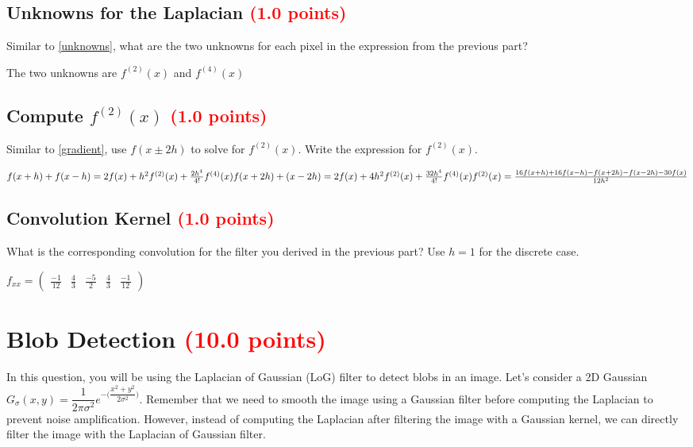 \documentclass[answers]{exam}
\newcommand{\mypoints}[1]{\textcolor{red}{(#1 points)}}
\begin{document}
\subsection{Unknowns for the Laplacian \mypoints{1.0}}
Similar to \ref{unknowns}, what are the two unknowns for each pixel in the expression from the previous part?
\begin{solution}
The two unknowns are $f^{(2)}(x)$ and $f^{(4)}(x)$
\end{solution}

\subsection{Compute $f^{(2)}(x)$ \mypoints{1.0}}
Similar  to \ref{gradient}, use $f(x \pm 2h)$ to solve for $f^{(2)}(x)$. Write the expression for $f^{(2)}(x)$.
\begin{solution}
$
f(x+h)+f(x-h)=2f(x) + h^2 f^{(2)}(x)+\frac{2h^{4}}{4!} f^{(4)}(x) \\
f(x+2h)+(x-2h)=2f(x) + 4h^2 f^{(2)}(x)+\frac{32h^{4}}{4!} f^{(4)}(x) \\\\
f^{(2)}(x) = \frac{16f(x+h)+16f(x-h)-f(x+2h)-f(x-2h)-30f(x)}{12h^2}
$
\end{solution}

\subsection{Convolution Kernel \mypoints{1.0}}
What is the corresponding convolution for the filter you derived in the previous part? Use $h=1$ for the discrete case.
\begin{solution}
$
f_{xx} = \begin{pmatrix}
\frac{-1}{12} & \frac{4}{3} & \frac{-5}{2} & \frac{4}{3} & \frac{-1}{12}
\end{pmatrix}
$
\end{solution}

\newpage
\section{Blob Detection \mypoints{10.0}}
In this question, you will be using the Laplacian of Gaussian (LoG) filter to detect blobs in an image. Let's consider a 2D Gaussian $G_{\sigma}(x,y) = \dfrac{1}{2\pi \sigma^2} e^{-\big(\dfrac{x^2+y^2}{2\sigma^2}\big)}$. Remember that we need to smooth the image using a Gaussian filter before computing the Laplacian to prevent noise amplification. However, instead of computing the Laplacian after filtering the image with a Gaussian kernel, we can directly filter the image with the Laplacian of Gaussian filter.
\end{document}
